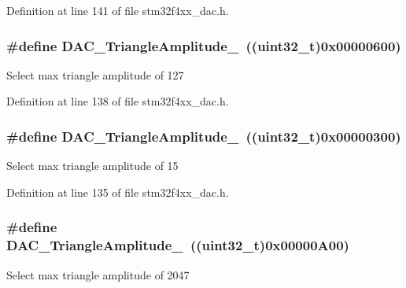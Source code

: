 Definition at line 141 of file stm32f4xx\-\_\-dac.\-h.

\hypertarget{group___d_a_c__lfsrunmask__triangleamplitude_gaacec0af3f69db46f8984be3af9ecadfb}{
\subsubsection[{D\-A\-C\-\_\-\-Triangle\-Amplitude\-\_\-127}]{\setlength{\rightskip}{0pt plus 5cm}\#define D\-A\-C\-\_\-\-Triangle\-Amplitude\-\_~((uint32\-\_\-t)0x00000600)}}\label{group___d_a_c__lfsrunmask__triangleamplitude_gaacec0af3f69db46f8984be3af9ecadfb}
Select max triangle amplitude of 127 

Definition at line 138 of file stm32f4xx\-\_\-dac.\-h.

\hypertarget{group___d_a_c__lfsrunmask__triangleamplitude_ga42653712ce783d33ecb2f3e97e9c2ece}{
\subsubsection[{D\-A\-C\-\_\-\-Triangle\-Amplitude\-\_\-15}]{\setlength{\rightskip}{0pt plus 5cm}\#define D\-A\-C\-\_\-\-Triangle\-Amplitude\-\_~((uint32\-\_\-t)0x00000300)}}\label{group___d_a_c__lfsrunmask__triangleamplitude_ga42653712ce783d33ecb2f3e97e9c2ece}
Select max triangle amplitude of 15 

Definition at line 135 of file stm32f4xx\-\_\-dac.\-h.

\hypertarget{group___d_a_c__lfsrunmask__triangleamplitude_gad33d28d7fcc09d84500ea9b6e6c5feed}{
\subsubsection[{D\-A\-C\-\_\-\-Triangle\-Amplitude\-\_\-2047}]{\setlength{\rightskip}{0pt plus 5cm}\#define D\-A\-C\-\_\-\-Triangle\-Amplitude\-\_~((uint32\-\_\-t)0x00000\-A00)}}\label{group___d_a_c__lfsrunmask__triangleamplitude_gad33d28d7fcc09d84500ea9b6e6c5feed}
Select max triangle amplitude of 2047 

